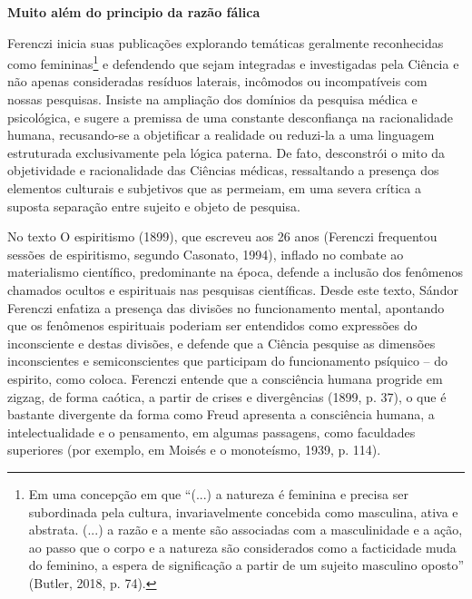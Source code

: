 \textbf{Muito além do principio da razão fálica }

Ferenczi inicia suas publicações explorando temáticas geralmente
reconhecidas como femininas\footnote{Em uma concepção em que ``(...) a
  natureza é feminina e precisa ser subordinada pela cultura,
  invariavelmente concebida como masculina, ativa e abstrata. (...) a
  razão e a mente são associadas com a masculinidade e a ação, ao passo
  que o corpo e a natureza são considerados como a facticidade muda do
  feminino, a espera de significação a partir de um sujeito masculino
  oposto'' (Butler, 2018, p. 74).} e defendendo que sejam integradas e
investigadas pela Ciência e não apenas consideradas resíduos laterais,
incômodos ou incompatíveis com nossas pesquisas. Insiste na ampliação
dos domínios da pesquisa médica e psicológica, e sugere a premissa de
uma constante desconfiança na racionalidade humana, recusando-se a
objetificar a realidade ou reduzi-la a uma linguagem estruturada
exclusivamente pela lógica paterna. De fato, desconstrói o mito da
objetividade e racionalidade das Ciências médicas, ressaltando a
presença dos elementos culturais e subjetivos que as permeiam, em uma
severa crítica a suposta separação entre sujeito e objeto de pesquisa.

No texto O espiritismo (1899), que escreveu aos 26 anos (Ferenczi
frequentou sessões de espiritismo, segundo Casonato, 1994), inflado no
combate ao materialismo científico, predominante na época, defende a
inclusão dos fenômenos chamados ocultos e espirituais nas pesquisas
científicas. Desde este texto, Sándor Ferenczi enfatiza a presença das
divisões no funcionamento mental, apontando que os fenômenos espirituais
poderiam ser entendidos como expressões do inconsciente e destas
divisões, e defende que a Ciência pesquise as dimensões inconscientes e
semiconscientes que participam do funcionamento psíquico -- do espirito,
como coloca. Ferenczi entende que a consciência humana progride em
zigzag, de forma caótica, a partir de crises e divergências (1899, p.
37), o que é bastante divergente da forma como Freud apresenta a
consciência humana, a intelectualidade e o pensamento, em algumas
passagens, como faculdades superiores (por exemplo, em Moisés e o
monoteísmo, 1939, p. 114).

